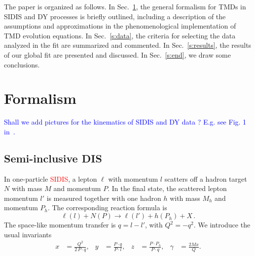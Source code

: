 \documentclass[aps,preprintnumbers,showpacs,nofootinbib,superscriptaddress,floatfix]{revtex4}
\begin{document}
The paper is organized as follows. In Sec.~\ref{s:theory}, the general
formalism for TMDs in SIDIS and DY processes is briefly outlined, including a
description of the assumptions and approximations in the phenomenological
implementation of TMD evolution equations. In Sec.~\ref{s:data}, the criteria
for selecting the data analyzed in the fit are summarized and commented. In
Sec.~\ref{s:results}, the results of our global fit are presented and
discussed. In Sec.~\ref{s:end}, we draw some conclusions. 
   

\section{Formalism}
\label{s:theory}

\textcolor{blue}{Shall we add pictures for the kinematics of SIDIS and DY data ? E.g. see Fig. 1 in~\cite{Signori:2013mda}.}

\subsection{Semi-inclusive DIS}
\label{ss:SIDIS_formalism}

In one-particle \textcolor{red}{SIDIS}, a lepton $\ell$ with momentum $l$ scatters 
off a hadron target $N$ with mass $M$ and momentum
$P$. In the final state, the scattered lepton momentum 
$l'$ is measured together with
one hadron $h$ with mass $M_h$
and momentum $P_h$. The corresponding reaction formula is  
\begin{equation}
  \label{e:sidis}
\ell(l) + N(P) \to \ell(l') + h(P_h) + X \, .
\end{equation}
The space-like momentum transfer is $q = l - l'$, with $Q^2 = - q^2$. We
introduce the usual invariants  
\begin{align}
  \label{e:xyz}
x &= \frac{Q^2}{2\,P\cdot q},
&
y &= \frac{P \cdot q}{P \cdot l},
&
z &= \frac{P \cdot P_h}{P\cdot q},
&
\gamma &= \frac{2 M x}{Q} .
\end{align}
\end{document}
